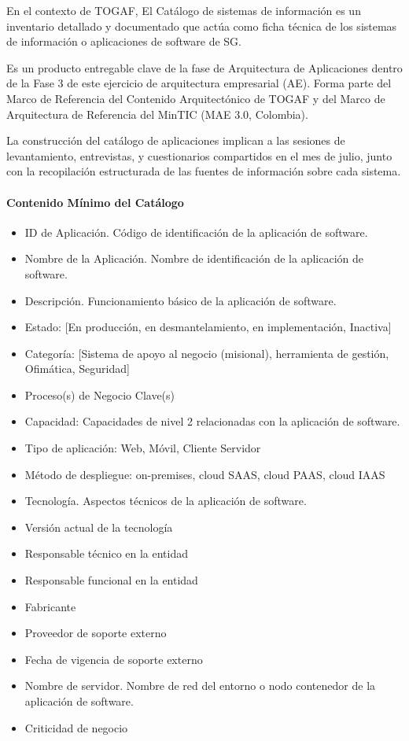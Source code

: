 \documentclass[
	a4paper, %
	12pt, %
]{include/CSSullivanBusinessReport}
\def\tightlist{}
\begin{document}
En el contexto de TOGAF, El Catálogo de sistemas de información es un
inventario detallado y documentado que actúa como ficha técnica de los
sistemas de información o aplicaciones de software de SG.

Es un producto entregable clave de la fase de Arquitectura de
Aplicaciones dentro de la Fase 3 de este ejercicio de arquitectura
empresarial (AE). Forma parte del Marco de Referencia del Contenido
Arquitectónico de TOGAF y del Marco de Arquitectura de Referencia del
MinTIC (MAE 3.0, Colombia).

La construcción del catálogo de aplicaciones implican a las sesiones de
levantamiento, entrevistas, y cuestionarios compartidos en el mes de
julio, junto con la recopilación estructurada de las fuentes de
información sobre cada sistema.

\paragraph{Contenido Mínimo del
Catálogo}\label{sec:contenido-muxednimo-del-catuxe1logo}

\begin{itemize}
\tightlist
\item
  ID de Aplicación. Código de identificación de la aplicación de
  software.
\item
  Nombre de la Aplicación. Nombre de identificación de la aplicación de
  software.
\item
  Descripción. Funcionamiento básico de la aplicación de software.
\item
  Estado: {[}En producción, en desmantelamiento, en implementación,
  Inactiva{]}
\item
  Categoría: {[}Sistema de apoyo al negocio (misional), herramienta de
  gestión, Ofimática, Seguridad{]}
\item
  Proceso(s) de Negocio Clave(s)
\item
  Capacidad: Capacidades de nivel 2 relacionadas con la aplicación de
  software.
\item
  Tipo de aplicación: Web, Móvil, Cliente Servidor
\item
  Método de despliegue: on-premises, cloud SAAS, cloud PAAS, cloud IAAS
\item
  Tecnología. Aspectos técnicos de la aplicación de software.
\item
  Versión actual de la tecnología
\item
  Responsable técnico en la entidad
\item
  Responsable funcional en la entidad
\item
  Fabricante
\item
  Proveedor de soporte externo
\item
  Fecha de vigencia de soporte externo
\item
  Nombre de servidor. Nombre de red del entorno o nodo contenedor de la
  aplicación de software.
\item
  Criticidad de negocio
\end{itemize}
\end{document}
